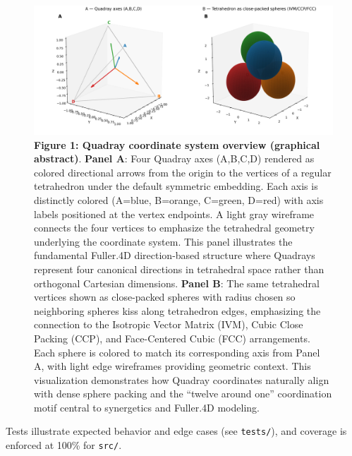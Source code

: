 \documentclass[
  10pt,
]{article}
\begin{document}
\begin{figure}
\centering
\includegraphics{figures/graphical_abstract_quadray.png}
\caption{\textbf{Figure 1: Quadray coordinate system overview (graphical
abstract)}. \textbf{Panel A}: Four Quadray axes (A,B,C,D) rendered as
colored directional arrows from the origin to the vertices of a regular
tetrahedron under the default symmetric embedding. Each axis is
distinctly colored (A=blue, B=orange, C=green, D=red) with axis labels
positioned at the vertex endpoints. A light gray wireframe connects the
four vertices to emphasize the tetrahedral geometry underlying the
coordinate system. This panel illustrates the fundamental Fuller.4D
direction-based structure where Quadrays represent four canonical
directions in tetrahedral space rather than orthogonal Cartesian
dimensions. \textbf{Panel B}: The same tetrahedral vertices shown as
close-packed spheres with radius chosen so neighboring spheres kiss
along tetrahedron edges, emphasizing the connection to the Isotropic
Vector Matrix (IVM), Cubic Close Packing (CCP), and Face-Centered Cubic
(FCC) arrangements. Each sphere is colored to match its corresponding
axis from Panel A, with light edge wireframes providing geometric
context. This visualization demonstrates how Quadray coordinates
naturally align with dense sphere packing and the ``twelve around one''
coordination motif central to synergetics and Fuller.4D modeling.}
\end{figure}

Tests illustrate expected behavior and edge cases (see \texttt{tests/}),
and coverage is enforced at 100\% for \texttt{src/}.
\end{document}

